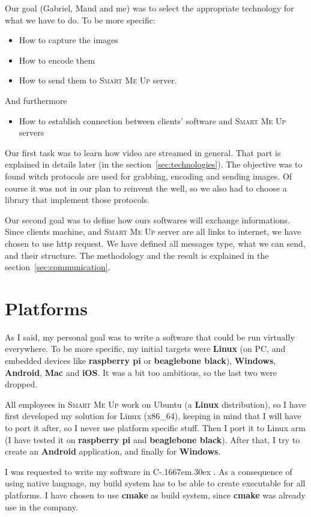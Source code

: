 \documentclass[a4paper,11pt]{custom}
\newcommand{\smu}{\textsc{Smart Me Up}\xspace}
\newcommand{\cmake}{\textbf{cmake}\xspace}
\newcommand{\rpi}{\textbf{raspberry pi}\xspace}
\newcommand{\bbb}{\textbf{beaglebone black}\xspace}
\newcommand{\linux}{\textbf{Linux}\xspace}
\newcommand{\win}{\textbf{Windows}\xspace}
\newcommand{\mac}{\textbf{Mac}\xspace}
\newcommand{\android}{\textbf{Android}\xspace}
\newcommand{\ios}{\textbf{iOS}\xspace}
\newcommand{\cpp}{%
  C\kern-.1667em\raise.30ex\hbox{\smaller{++}}%
  \spacefactor1000\xspace%
}
\begin{document}
Our goal (Gabriel, Maud and me) was to select the appropriate technology for
what we have to do. To be more specific:
\begin{itemize}
\item How to capture the images
\item How to encode them
\item How to send them to \smu{} server.
\end{itemize}

And furthermore
\begin{itemize}
\item How to establish connection between clients' software and \smu{} servers
\end{itemize}

Our first task was to learn how video are streamed in general. That part is
explained in details later (in the section~\ref{sec:technologies}). The objective
was to found witch protocols are used for grabbing, encoding and sending images. Of
course it was not in our plan to reinvent the well, so we also had to choose a
library that implement those protocols.

Our second goal was to define how ours softwares will exchange informations.
Since clients machine, and \smu{} server are all links to internet, we have
chosen to use http request. We have defined all messages type, what we can send,
and their structure. The methodology and the result is explained in the
section~\ref{sec:communication}.

\section{Platforms}

As I said, my personal goal was to write a software that could be run virtually
everywhere. To be more specific, my initial targets were \linux{} (on PC, and
embedded devices like \rpi or \bbb), \win, \android, \mac{} and \ios. It was a
bit too ambitious, so the last two were dropped.

All employees in \smu work on Ubuntu (a \linux{} distribution), so I have first
developed my solution for Linux (x86\_64), keeping in mind that I will have to port it
after, so I never use platform specific stuff. Then I port it to Linux arm (I
have tested it on \rpi{} and \bbb). After that, I try to create an \android{}
application, and finally for \win.

I was requested to write my software in \cpp. As a consequence of using native
language, my build system has to be able to create executable for all
platforms. I have chosen to use \cmake{} as build system, since \cmake{} was
already use in the company.
\end{document}

